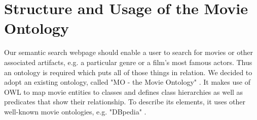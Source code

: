 \section{Structure and Usage of the Movie Ontology}
Our semantic search webpage should enable a user to search for movies or other associated artifacts, e.g. a particular genre or a film's most famous actors. Thus an ontology is required which puts all of those things in relation. We decided to adopt an existing ontology, called "MO - the Movie Ontology" \cite{bouza:movieontology}. It makes use of OWL to map movie entities to classes and defines class hierarchies as well as predicates that show their relationship. To describe its elements, it uses other well-known movie ontologies, e.g. "DBpedia" \cite{dbpedia-swj}.
